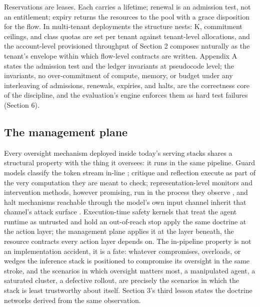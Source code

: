 Reservations are leases. Each carries a lifetime; renewal is an admission
test, not an entitlement; expiry returns the resources to the pool with a
grace disposition for the flow. In multi-tenant deployments the structure
nests: K, commitment ceilings, and class quotas are set per tenant
against tenant-level allocations, and the account-level provisioned
throughput of Section 2 composes naturally as the tenant's envelope
within which flow-level contracts are written. Appendix A states the
admission test and the ledger invariants at pseudocode level; the
invariants, no over-commitment of compute, memory, or budget under any
interleaving of admissions, renewals, expiries, and halts, are the
correctness core of the discipline, and the evaluation's engine enforces
them as hard test failures (Section 6).

\subsection{The management plane}

Every oversight mechanism deployed inside today's serving stacks shares a
structural property with the thing it oversees: it runs in the same
pipeline. Guard models classify the token stream in-line
\citep{llamaguard2023}; critique and reflection execute as part of the very
computation they are meant to check; representation-level monitors and
intervention methods, however promising, run in the process they observe
\citep{zou2024circuitbreakers}, and halt mechanisms reachable through the
model's own input channel inherit that channel's attack surface
\citep{killbench2025}. Execution-time safety kernels that treat the agent
runtime as untrusted and hold an out-of-reach stop \citep{safetykernel2026}
apply the same doctrine at the action layer; the management plane applies
it at the layer beneath, the resource contracts every action layer
depends on. The in-pipeline property is not an implementation accident,
it is a fate: whatever compromises, overloads, or wedges the inference
stack is positioned to compromise its oversight in the same stroke, and
the scenarios in which oversight matters most, a manipulated agent, a
saturated cluster, a defective rollout, are precisely the scenarios in
which the stack is least trustworthy about itself. Section 3's third
lesson states the doctrine networks derived from the same observation.


